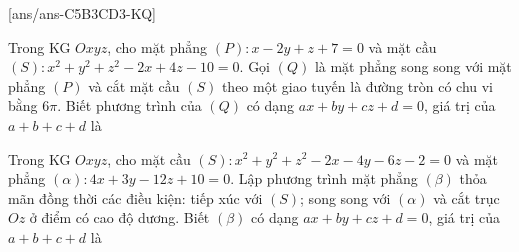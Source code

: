 [ans/ans-C5B3CD3-KQ]
\TNSA
\begin{ex}%
	Trong KG $Oxyz$, cho mặt phẳng $(P)\colon x-2y+z+7=0$ và mặt cầu $(S)\colon x^2+y^2+z^2-2x+4z-10=0$. Gọi $(Q)$ là mặt phẳng song song với mặt phẳng $(P)$ và cắt mặt cầu $(S)$ theo một giao tuyến là đường tròn có chu vi bằng $6\pi$. Biết phương trình của $(Q)$ có dạng $ax+by+cz+d=0$, giá trị của $a+b+c+d$ là
\end{ex}
\begin{ex}%
	Trong KG $Oxyz$, cho mặt cầu $(S)\colon x^2+y^2+z^2-2x-4y-6z-2=0$ và mặt phẳng $(\alpha)\colon 4x+3y-12z+10=0$. Lập phương trình mặt phẳng $(\beta)$ thỏa mãn đồng thời các điều kiện: tiếp xúc với $(S)$; song song với $(\alpha)$ và cắt trục $Oz$ ở điểm có cao độ dương. Biết $(\beta)$ có dạng $ax+by+cz+d=0$, giá trị của $a+b+c+d$ là
\end{ex}
